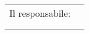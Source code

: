 {\begin{titlepage}
\begin{center}
\begin{tabular}{ll}


			\end{tabular}
		\end{center}
		\vspace{2cm}
		\ifdefined\Responsabile
			\begin{flushright}
				\begin{tabular}{ll}
					Il responsabile: & \Responsabile            \\
					                 &                          \\
					                 & \underline{\hspace{3cm}} \\
				\end{tabular}
			\end{flushright}
		\fi
	\end{titlepage}
	\newpage
}

